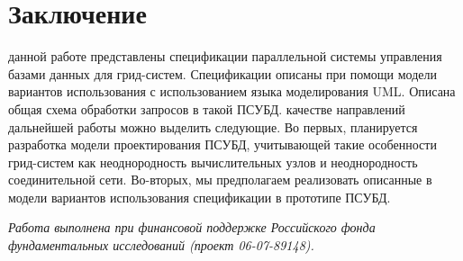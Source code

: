 \documentclass[11pt,oneside]{article}
\begin{document}
\section{Заключение}\label{S_Conclusion}
 данной работе представлены спецификации параллельной системы управления базами данных для грид-систем. Спецификации описаны при помощи модели вариантов использования с использованием языка моделирования UML. Описана общая схема обработки запросов в такой ПСУБД.
 качестве направлений дальнейшей работы можно выделить следующие. Во первых, планируется разработка модели проектирования ПСУБД, учитывающей такие особенности грид-систем как неоднородность вычислительных узлов и неоднородность соединительной сети. Во-вторых, мы предполагаем реализовать описанные в модели вариантов использования спецификации в прототипе ПСУБД.
\par{\it Работа выполнена при финансовой поддержке Российского фонда фундаментальных исследований (проект 06-07-89148).}
\end{document}
